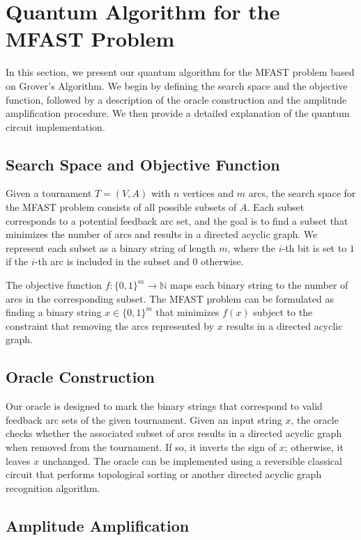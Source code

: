 \section{Quantum Algorithm for the MFAST Problem}
\label{sec:algorithm}

In this section, we present our quantum algorithm for the MFAST problem based on Grover's Algorithm. We begin by defining the search space and the objective function, followed by a description of the oracle construction and the amplitude amplification procedure. We then provide a detailed explanation of the quantum circuit implementation.

\subsection{Search Space and Objective Function}

Given a tournament $T = (V, A)$ with $n$ vertices and $m$ arcs, the search space for the MFAST problem consists of all possible subsets of $A$. Each subset corresponds to a potential feedback arc set, and the goal is to find a subset that minimizes the number of arcs and results in a directed acyclic graph. We represent each subset as a binary string of length $m$, where the $i$-th bit is set to $1$ if the $i$-th arc is included in the subset and $0$ otherwise.

The objective function $f: \{0, 1\}^m \rightarrow \mathbb{N}$ maps each binary string to the number of arcs in the corresponding subset. The MFAST problem can be formulated as finding a binary string $x \in \{0, 1\}^m$ that minimizes $f(x)$ subject to the constraint that removing the arcs represented by $x$ results in a directed acyclic graph.

\subsection{Oracle Construction}

Our oracle is designed to mark the binary strings that correspond to valid feedback arc sets of the given tournament. Given an input string $x$, the oracle checks whether the associated subset of arcs results in a directed acyclic graph when removed from the tournament. If so, it inverts the sign of $x$; otherwise, it leaves $x$ unchanged. The oracle can be implemented using a reversible classical circuit that performs topological sorting or another directed acyclic graph recognition algorithm.

\subsection{Amplitude Amplification}

